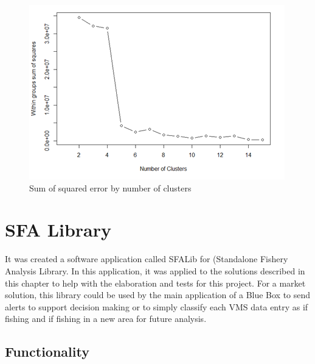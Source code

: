 \begin{figure}[H]
\centering
\includegraphics[width=0.8\linewidth]{Chapters/img/elbow_method.png}
\caption{Sum of squared error by number of clusters}
\label{fig:elbow_method}
\end{figure}






\section{SFA Library} %
\label{sub:sfa_library}

It was created a software application called SFALib for (Standalone Fishery Analysis Library. In this application, it was applied to the solutions described in this chapter to help with the elaboration and tests for this project. For a market solution, this library could be used by the main application of a Blue Box to send alerts to support decision making or to simply classify each VMS data entry as if fishing and if fishing in a new area for future analysis.



\subsection{Functionality} %
\label{sub:functionality}

